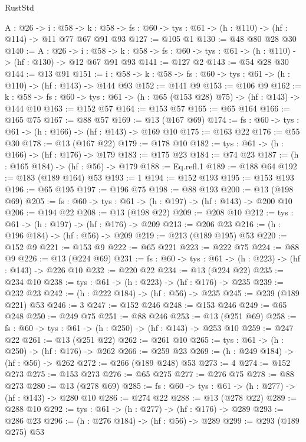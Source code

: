 \begin{lexlean}{RustStd}
\begin{coremodule}
{\begin{coremodule}
{{{{{{{{{{{{{{{{{{{{{  {A : @26} ->
  {i : @58} ->
  {k : @58} -> {fs : @60} -> {tys : @61} -> (h : @110) -> (hf : @114) -> @11 @77 @67 @91 @93
@127 := @105 @1
@130 := @48 @80 @28 @30
@140 := {A : @26} ->
  {i : @58} ->
  {k : @58} -> {fs : @60} -> {tys : @61} -> (h : @110) -> (hf : @130) -> @12 @67 @91 @93
@141 := @127 @2
@143 := @54 @28 @30
@144 := @13 @91
@151 := {i : @58} -> {k : @58} -> {fs : @60} -> {tys : @61} -> (h : @110) -> (hf : @143) -> @144 @93
@152 := @141 @9
@153 := @106 @9
@162 := {k : @58} ->
  {fs : @60} -> {tys : @61} -> (h : @65 (@153 @28) @75) -> (hf : @143) -> @144 @10
@163 := @152 @57
@164 := @153 @57
@165 := @65 @164
@166 := @165 @75
@167 := @88 @57
@169 := @13 (@167 @69)
@174 := {fs : @60} -> {tys : @61} -> (h : @166) -> (hf : @143) -> @169 @10
@175 := @163 @22
@176 := @55 @30
@178 := @13 (@167 @22)
@179 := @178 @10
@182 := {tys : @61} -> (h : @166) -> (hf : @176) -> @179
@183 := @175 @23
@184 := @74 @23
@187 := (h : @165 @184) -> (hf : @56) -> @179
@188 := Eq.refl.{1}
@189 := @188 @64
@192 := @183 (@189 @164) @53
@193 := 1
@194 := @152 @193
@195 := @153 @193
@196 := @65 @195
@197 := @196 @75
@198 := @88 @193
@200 := @13 (@198 @69)
@205 := {fs : @60} -> {tys : @61} -> (h : @197) -> (hf : @143) -> @200 @10
@206 := @194 @22
@208 := @13 (@198 @22)
@209 := @208 @10
@212 := {tys : @61} -> (h : @197) -> (hf : @176) -> @209
@213 := @206 @23
@216 := (h : @196 @184) -> (hf : @56) -> @209
@219 := @213 (@189 @195) @53
@220 := @152 @9
@221 := @153 @9
@222 := @65 @221
@223 := @222 @75
@224 := @88 @9
@226 := @13 (@224 @69)
@231 := {fs : @60} -> {tys : @61} -> (h : @223) -> (hf : @143) -> @226 @10
@232 := @220 @22
@234 := @13 (@224 @22)
@235 := @234 @10
@238 := {tys : @61} -> (h : @223) -> (hf : @176) -> @235
@239 := @232 @23
@242 := (h : @222 @184) -> (hf : @56) -> @235
@245 := @239 (@189 @221) @53
@246 := 3
@247 := @152 @246
@248 := @153 @246
@249 := @65 @248
@250 := @249 @75
@251 := @88 @246
@253 := @13 (@251 @69)
@258 := {fs : @60} -> {tys : @61} -> (h : @250) -> (hf : @143) -> @253 @10
@259 := @247 @22
@261 := @13 (@251 @22)
@262 := @261 @10
@265 := {tys : @61} -> (h : @250) -> (hf : @176) -> @262
@266 := @259 @23
@269 := (h : @249 @184) -> (hf : @56) -> @262
@272 := @266 (@189 @248) @53
@273 := 4
@274 := @152 @273
@275 := @153 @273
@276 := @65 @275
@277 := @276 @75
@278 := @88 @273
@280 := @13 (@278 @69)
@285 := {fs : @60} -> {tys : @61} -> (h : @277) -> (hf : @143) -> @280 @10
@286 := @274 @22
@288 := @13 (@278 @22)
@289 := @288 @10
@292 := {tys : @61} -> (h : @277) -> (hf : @176) -> @289
@293 := @286 @23
@296 := (h : @276 @184) -> (hf : @56) -> @289
@299 := @293 (@189 @275) @53
}}}}}}}}}}}}}}}}}}}}}
\end{coremodule}}
\end{coremodule}
\end{lexlean}
